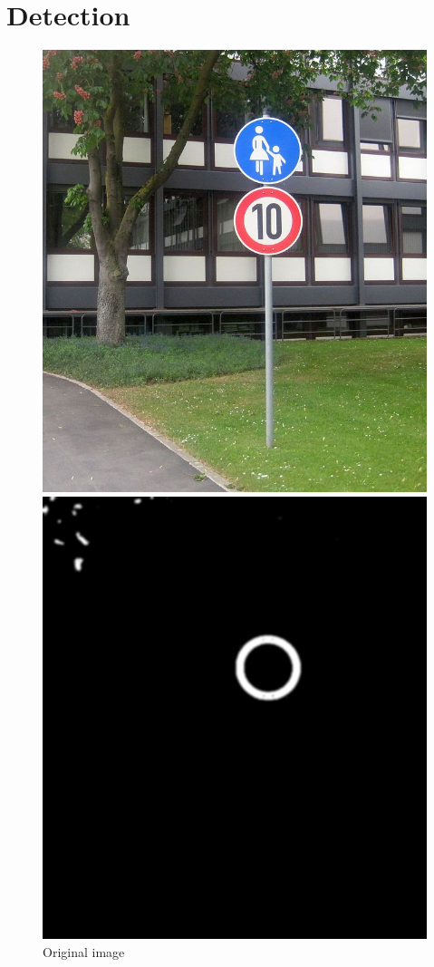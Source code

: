 \section{Detection}
\begin{figure}[H]
	\includegraphics[width=\linewidth]{images/101.jpg}
	\caption{Original image\protect\footnotemark}\label{fig:original_image10}
	\endminipage\hfill
	\includegraphics[width=\linewidth]{images/filteredimg.png}

\end{figure}
